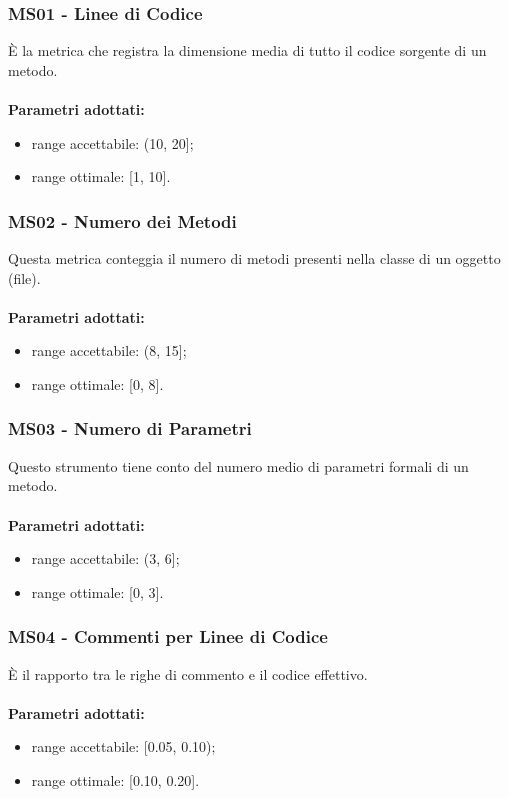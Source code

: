 \subsubsection{MS01 - Linee di Codice}
È la metrica che registra la dimensione media di tutto il codice sorgente di un metodo.\\ \\
\textbf{Parametri adottati:}
\begin{itemize}
\item range accettabile: (10, 20];
\item range ottimale: [1, 10].
\end{itemize}
\subsubsection{MS02 - Numero dei Metodi}
Questa metrica conteggia il numero di metodi presenti nella classe di un oggetto (file).\\ \\ 
\textbf{Parametri adottati:} 
\begin{itemize}
\item range accettabile: (8, 15];
\item range ottimale: [0, 8].
\end{itemize}
\subsubsection{MS03 - Numero di Parametri}
Questo strumento tiene conto del numero medio di parametri formali di un metodo.\\ \\ 
\textbf{Parametri adottati:} 
\begin{itemize}
\item range accettabile: (3, 6];
\item range ottimale: [0, 3].
\end{itemize}
\subsubsection{MS04 - Commenti per Linee di Codice}
È il rapporto tra le righe di commento e il codice effettivo.\\ \\ 
\textbf{Parametri adottati:} 
\begin{itemize}
\item range accettabile: [0.05, 0.10);
\item range ottimale: [0.10, 0.20].
\end{itemize}
